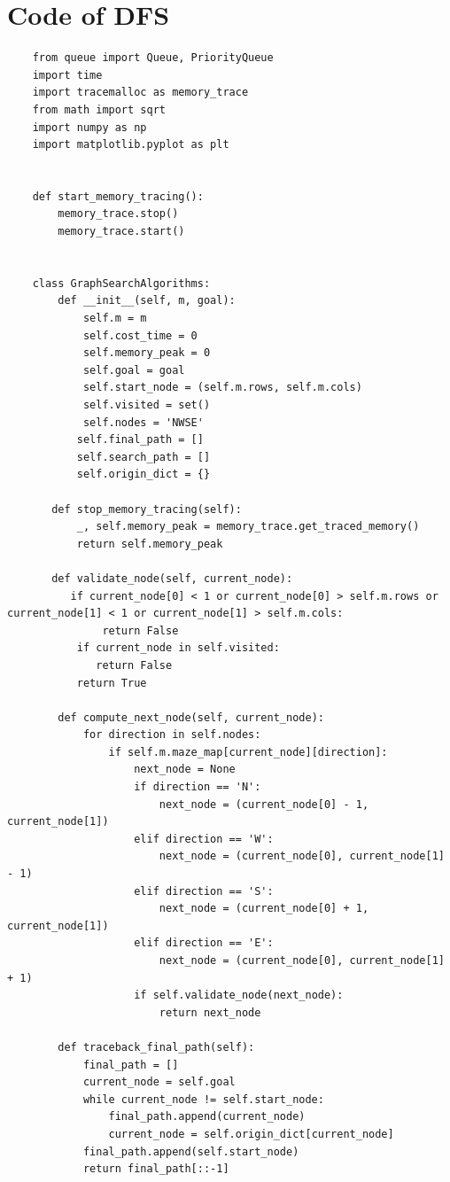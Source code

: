\documentclass{article}
\begin{document}
\section{Code of DFS}
\begin{lstlisting}
    from queue import Queue, PriorityQueue
    import time
    import tracemalloc as memory_trace
    from math import sqrt
    import numpy as np
    import matplotlib.pyplot as plt


    def start_memory_tracing():
        memory_trace.stop()
        memory_trace.start()


    class GraphSearchAlgorithms:
        def __init__(self, m, goal):
            self.m = m
            self.cost_time = 0
            self.memory_peak = 0
            self.goal = goal
            self.start_node = (self.m.rows, self.m.cols)
            self.visited = set()
            self.nodes = 'NWSE'
           self.final_path = []
           self.search_path = []
           self.origin_dict = {}

       def stop_memory_tracing(self):
           _, self.memory_peak = memory_trace.get_traced_memory()
           return self.memory_peak

       def validate_node(self, current_node):
          if current_node[0] < 1 or current_node[0] > self.m.rows or current_node[1] < 1 or current_node[1] > self.m.cols:
               return False
           if current_node in self.visited:
              return False
           return True

        def compute_next_node(self, current_node):
            for direction in self.nodes:
                if self.m.maze_map[current_node][direction]:
                    next_node = None
                    if direction == 'N':
                        next_node = (current_node[0] - 1, current_node[1])
                    elif direction == 'W':
                        next_node = (current_node[0], current_node[1] - 1)
                    elif direction == 'S':
                        next_node = (current_node[0] + 1, current_node[1])
                    elif direction == 'E':
                        next_node = (current_node[0], current_node[1] + 1)
                    if self.validate_node(next_node):
                        return next_node

        def traceback_final_path(self):
            final_path = []
            current_node = self.goal
            while current_node != self.start_node:
                final_path.append(current_node)
                current_node = self.origin_dict[current_node]
            final_path.append(self.start_node)
            return final_path[::-1]


\end{lstlisting}
\end{document}
